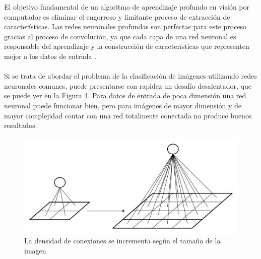     El objetivo fundamental de un algoritmo de aprendizaje profundo en visión por computador es eliminar el engorroso y limitante proceso de extracción de características. Las redes neuronales profundas son perfectas para este proceso gracias al proceso de convolución, ya que cada capa de una red neuronal es responsable del aprendizaje y la construcción de características que representen mejor a los datos de entrada \cite{dlBook}.
    \\\\
    Si se trata de abordar el problema de la clasificación de imágenes utilizando redes neuronales comunes, puede presentarse con rapidez un desafío desalentador, que se puede ver en la Figura \ref{fig:fc_dont_scale}. Para datos de entrada de poca dimensión una red neuronal puede funcionar bien, pero para imágenes de mayor dimensión y de mayor complejidad contar con una red totalmente conectada no produce buenos resultados.
    \begin{figure}[htp]
        \centering
        \includegraphics[scale=0.35]{chapter3/fc_dont_scale.png}
        \caption{La densidad de conexiones se incrementa según el tamaño de la imagen}
        \label{fig:fc_dont_scale}
    \end{figure}

